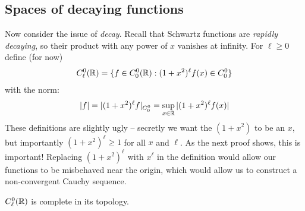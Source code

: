     \subsection{Spaces of decaying functions}
      Now consider the issue of \emph{decay}.
      Recall that Schwartz functions are \emph{rapidly decaying}, so their product with any power of $x$ vanishes at infinity.
      For $\ell\ge0$ define (for now)
      \begin{align*}
        C^0_\ell(\mathbb{R}) = \{f\in C^0_0(\mathbb{R}):(1+x^2)^\ell f(x)\in C^0_0\}
      \end{align*}
      with the norm:
      \begin{align*}
        |f| = |(1+x^2)^\ell f|_{C^0_0} = \sup_{x\in\mathbb{R}} |(1+x^2)^\ell f(x)|
      \end{align*}
      These definitions are slightly ugly -- secretly we want the $(1+x^2)$ to be an $x$, but importantly $(1+x^2)^\ell\ge1$ for all $x$ and $\ell$.
      As the next proof shows, this is important!
      Replacing $(1+x^2)^\ell$ with $x^\ell$ in the definition would allow our functions to be misbehaved near the origin, which would allow us to construct a non-convergent Cauchy sequence.
      \begin{thm}
        \label{thm:c0lcomplete}
        $C^0_\ell(\mathbb{R})$ is complete in its topology.
      \end{thm}
